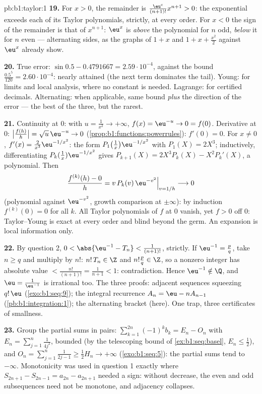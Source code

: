 \begin{solution}{pb:b1:taylor:1}
\textbf{19.} For $x > 0$, the remainder is $\frac{\eu^{c}}
{(n+1)!}x^{n+1} > 0$: the exponential exceeds each of its
Taylor polynomials, strictly, at every order. For $x < 0$ the
sign of the remainder is that of $x^{n+1}$: $\eu^x$ is
\emph{above} the polynomial for $n$ odd, \emph{below} it for
$n$ even --- alternating sides, as the graphs of $1 + x$ and $1
+ x + \frac{x^2}{2}$ against $\eu^x$ already show.

\textbf{20.} True error: $\sin 0.5 - 0.4791667 =
2.59\cdot10^{-4}$, against the bound $\frac{0.5^5}{120} =
2.60\cdot10^{-4}$: nearly attained (the next term dominates the
tail). Young: for limits and local analysis, where no constant
is needed. Lagrange: for certified decimals. Alternating: when
applicable, same bound \emph{plus} the direction of the error
--- the best of the three, but the rarest.

\textbf{21.} Continuity at $0$: with $u = \frac{1}{x^2} \to
+\infty$, $f(x) = \eu^{-u} \to 0 = f(0)$. Derivative at $0$:
$\bigl|\frac{f(h)}{h}\bigr| = \sqrt u\,\eu^{-u} \to 0$
(\cref{prop:b1:functions:powerrules}): $f'(0) = 0$. For $x \neq
0$, $f'(x) = \frac{2}{x^3}\eu^{-1/x^2}$: the form
$P_1\bigl(\frac1x\bigr)\eu^{-1/x^2}$ with $P_1(X) = 2X^3$;
inductively, differentiating $P_k(\frac1x)\eu^{-1/x^2}$ gives
$P_{k+1}(X) = 2X^3 P_k(X) - X^2 P_k'(X)$, a polynomial. Then
\[
\frac{f^{(k)}(h) - 0}{h} = v\,P_k(v)\,\eu^{-v^2}
\Big|_{v = 1/h} \longrightarrow 0
\]
(polynomial against $\eu^{-v^2}$, growth comparison at
$\pm\infty$): by induction $f^{(k)}(0) = 0$ for all $k$. All
Taylor polynomials of $f$ at $0$ vanish, yet $f > 0$ off $0$:
Taylor--Young is exact at every order and blind beyond the
germ. An expansion is local information only.

\textbf{22.} By question 2, $0 < \abs{\eu^{-1} - T_n} <
\frac{1}{(n+1)!}$, strictly. If $\eu^{-1} = \frac pq$, take $n
\geq q$ and multiply by $n!$: $n!\,T_n \in \Z$ and $n!\frac pq
\in \Z$, so a nonzero integer has absolute value $<
\frac{n!}{(n+1)!} = \frac{1}{n+1} < 1$: contradiction. Hence
$\eu^{-1} \notin \Q$, and $\eu = \frac{1}{\eu^{-1}}$ is
irrational too. The three proofs: adjacent sequences squeezing
$q!\,\eu$ (\cref{exo:b1:seq:9}); the integral recurrence $A_n =
\eu - nA_{n-1}$ (\cref{pb:b1:integration:1}); the alternating
bracket (here). One trap, three certificates of smallness.

\textbf{23.} Group the partial sums in pairs: $\sum_{k=1}^{2n}
(-1)^k b_k = E_n - O_n$ with $E_n = \sum_{j=1}^{n}
\frac{1}{4j^2}$, bounded (by the telescoping bound of
\cref{ex:b1:seq:basel}, $E_n \leq \frac12$), and $O_n =
\sum_{j=1}^{n}\frac{1}{2j-1} \geq \frac12 H_n \to +\infty$
(\cref{exo:b1:seq:5}): the partial sums tend to $-\infty$.
Monotonicity was used in question 1 exactly where $S_{2n+1} -
S_{2n-1} = a_{2n} - a_{2n+1}$ needed a sign: without decrease,
the even and odd subsequences need not be monotone, and
adjacency collapses.


\end{solution}
